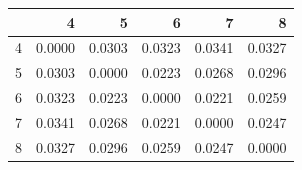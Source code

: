 \begin{tabular}{lrrrrr}
\toprule
 & 4 & 5 & 6 & 7 & 8 \\
\midrule
4 & 0.0000 & 0.0303 & 0.0323 & 0.0341 & 0.0327 \\
5 & 0.0303 & 0.0000 & 0.0223 & 0.0268 & 0.0296 \\
6 & 0.0323 & 0.0223 & 0.0000 & 0.0221 & 0.0259 \\
7 & 0.0341 & 0.0268 & 0.0221 & 0.0000 & 0.0247 \\
8 & 0.0327 & 0.0296 & 0.0259 & 0.0247 & 0.0000 \\
\bottomrule
\end{tabular}
